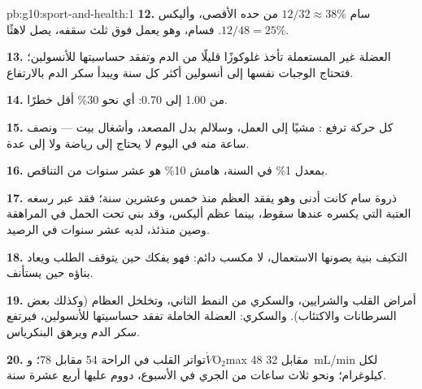 \begin{solution}{pb:g10:sport-and-health:1}
\textbf{12.} سام $12/32 \approx 38\%$ من حده الأقصى، وأليكس $12/48 =
25\%$. فسام، وهو يعمل فوق ثلث سقفه، يصل لاهثًا.

\textbf{13.} العضلة غير المستعملة تأخذ غلوكوزًا قليلًا من الدم وتفقد
حساسيتها للأنسولين؛ فتحتاج الوجبات نفسها إلى أنسولين أكثر كل سنة ويبدأ
سكر الدم بالارتفاع.

\textbf{14.} من 1.00 إلى 0.70: أي نحو 30\% أقل خطرًا.

\textbf{15.}  كل حركة ترفع : مشيًا إلى
العمل، وسلالم بدل المصعد، وأشغال بيت --- ونصف ساعة منه في اليوم لا
يحتاج إلى رياضة ولا إلى عدة.

\textbf{16.} بمعدل 1\% في السنة، هامش 10\% هو عشر سنوات من التناقص.

\textbf{17.} ذروة سام كانت أدنى وهو يفقد العظم منذ خمس وعشرين سنة؛
فقد عبر رسغه العتبة التي يكسره عندها سقوط، بينما عظم أليكس، وقد بني
تحت الحمل في المراهقة وصين منذئذ، لديه عشر سنوات في الرصيد.

\textbf{18.} التكيف بنية يصونها الاستعمال، لا مكسب دائم: فهو يفكك حين
يتوقف الطلب ويعاد بناؤه حين يستأنف.

\textbf{19.} أمراض القلب والشرايين، والسكري من النمط الثاني، وتخلخل
العظام (وكذلك بعض السرطانات والاكتئاب). والسكري: العضلة الخاملة تفقد
حساسيتها للأنسولين، فيرتفع سكر الدم ويرهق البنكرياس.

\textbf{20.} تواتر القلب في الراحة 54 مقابل 78؛
و$\dot V\!\mathrm{O_2}$max \num{48} مقابل \qty{32}{mL/min} لكل
كيلوغرام؛ ونحو ثلاث ساعات من الجري في الأسبوع، دووم عليها أربع عشرة سنة.
\end{solution}

